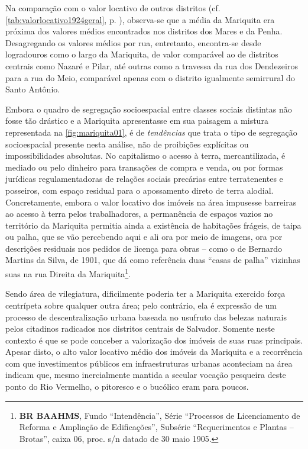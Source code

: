 Na comparação com o valor locativo de outros distritos (cf. \autoref{tab:valorlocativo1924geral}, p. \pageref{tab:valorlocativo1924geral}), observa-se que a média da Mariquita era próxima dos valores médios encontrados nos distritos dos Mares e da Penha. Desagregando os valores médios por rua, entretanto, encontra-se desde logradouros como o largo da Mariquita, de valor comparável ao de distritos centrais como Nazaré e Pilar, até outras como a travessa da rua dos Dendezeiros para a rua do Meio, comparável apenas com o distrito igualmente semirrural do Santo Antônio.


Embora o quadro de segregação socioespacial entre classes sociais distintas não fosse tão drástico e a Mariquita apresentasse em sua paisagem a mistura representada na \autoref{fig:mariquita01}, é de \textit{tendências} que trata o tipo de segregação socioespacial presente nesta análise, não de proibições explícitas ou impossibilidades absolutas. No capitalismo o acesso à terra, mercantilizada, é mediado ou pelo dinheiro para transações de compra e venda, ou por formas jurídicas regulamentadoras de relações sociais precárias entre terratenentes e posseiros, com espaço residual para o apossamento direto de terra alodial. Concretamente, embora o valor locativo dos imóveis na área impusesse barreiras ao acesso à terra pelos trabalhadores, a permanência de espaços vazios no território da Mariquita permitia ainda a existência de habitações frágeis, de taipa ou palha, que se vão percebendo aqui e ali ora por meio de imagens, ora por descrições residuais nos pedidos de licença para obras -- como o de Bernardo Martins da Silva, de 1901, que dá como referência duas ``casas de palha'' vizinhas suas na rua Direita da Mariquita\footnote{\textbf{BR BAAHMS}, Fundo ``Intendência'', Série ``Processos de Licenciamento de Reforma e Ampliação de Edificações'', Subsérie ``Requerimentos e Plantas -- Brotas'', caixa 06, proc. s/n datado de 30 maio 1905.}.

Sendo área de vilegiatura, dificilmente poderia ter a Mariquita exercido força centrípeta sobre qualquer outra área; pelo contrário, ela é expressão de um processo de descentralização urbana baseada no usufruto das belezas naturais pelos citadinos radicados nos distritos centrais de Salvador. Somente neste contexto é que se pode conceber a valorização dos imóveis de suas ruas principais. Apesar disto, o alto valor locativo médio dos imóveis da Mariquita e a recorrência com que investimentos públicos em infraestruturas urbanas aconteciam na área indicam que, mesmo inercialmente mantida a secular vocação pesqueira deste ponto do Rio Vermelho, o pitoresco e o bucólico eram para poucos. 

